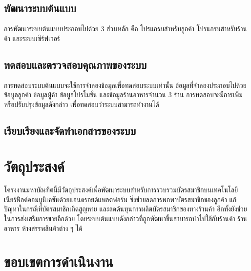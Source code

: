 \documentclass[12pt,a4paper]{article}
\begin{document}

\subsection{พัฒนาระบบต้นแบบ}
การพัฒนาระบบต้นแบบประกอบไปด้วย 3 ส่วนหลัก คือ โปรแกรมสำหรับลูกค้า โปรแกรมสำหรับร้านค้า และระบบเซิร์ฟเวอร์

\subsection{ทดสอบและตรวจสอบคุณภาพของระบบ}
การทดสอบระบบต้นแบบจะใช้การจำลองข้อมูลเพื่อทดสอบระบบเท่านั้น ข้อมูลที่จำลองประกอบไปด้วย ข้อมูลลูกค้า ข้อมูลผู้ค้า ข้อมูลโปรโมชั่น และข้อมูลร้านอาหารจำนวน 3 ร้าน การทดสอบจะมีการเพิ่มหรือปรับปรุงข้อมูลดังกล่าว เพื่อทดสอบว่าระบบสามารถทำงานได้


\subsection{เรียบเรียงและจัดทําเอกสารของระบบ}

\section{วัตถุประสงค์}
โครงงานมหาบัณฑิตนี้มีวัตถุประสงค์เพื่อพัฒนาระบบสำหรับการรวบรวมบัตรสมาชิกบนเทคโนโลยีเนียร์ฟิลด์คอมมูนิเคชันด้วยแอนดรอยด์แพลตฟอร์ม ซึ่งช่วยลดการพกพาบัตรสมาชิกของลูกค้า แก้ปัญหาในกรณีที่บัตรสมาชิกเกิดสูญหาย และลดต้นทุนการผลิตบัตรสมาชิกของทางร้านค้า อีกทั้งยังช่วยในการส่งเสริมการขายอีกด้วย โดยระบบต้นแบบดังกล่าวที่ถูกพัฒนาขึ้นสามารถนำไปใช้กับร้านค้า ร้านอาหาร ห้างสรรพสินค้าต่าง ๆ ได้

\section{ขอบเขตการดำเนินงาน}
\end{document}
